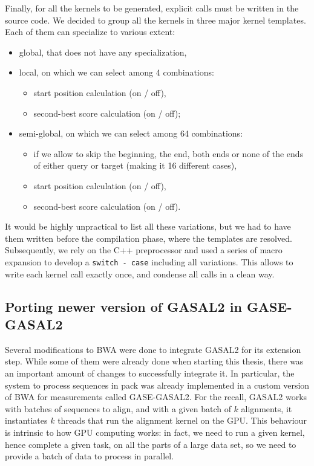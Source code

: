 Finally, for all the kernels to be generated, explicit calls must be written in the source code. We decided to group all the kernels in three major kernel templates. Each of them can specialize to various extent:

\begin{itemize}
	\item global, that does not have any specialization,
	\item local, on which we can select among 4 combinations:
	\begin{itemize}
		\item start position calculation (on / off),
		\item second-best score calculation (on / off);
	\end{itemize}
	\item semi-global, on which we can select among 64 combinations:
	\begin{itemize}
		\item if we allow to skip the beginning, the end, both ends or none of the ends of either query or target (making it 16 different cases),
		\item start position calculation (on / off),
		\item second-best score calculation (on / off).
	\end{itemize}
\end{itemize}

It would be highly unpractical to list all these variations, but we had to have them written before the compilation phase, where the templates are resolved. Subsequently, we rely on the C++ preprocessor and used a series of macro expansion to develop a \verb|switch - case| including all variations. This allows to write each kernel call exactly once, and condense all calls in a clean way.

\subsection{Porting newer version of GASAL2 in GASE-GASAL2}

Several modifications to BWA were done to integrate GASAL2 for its extension step. While some of them were already done when starting this thesis, there was an important amount of changes to successfully integrate it. In particular, the system to process sequences in pack was already implemented in a custom version of BWA for measurements called GASE-GASAL2\cite{Ahmed:gase-gasal2}. For the recall, GASAL2 works with batches of sequences to align, and with a given batch of $k$ alignments, it instantiates $k$ threads that run the alignment kernel on the GPU. This behaviour is intrinsic to how GPU computing works: in fact, we need to run a given kernel, hence complete a given task, on all the parts of a large data set, so we need to provide a batch of data to process in parallel.


